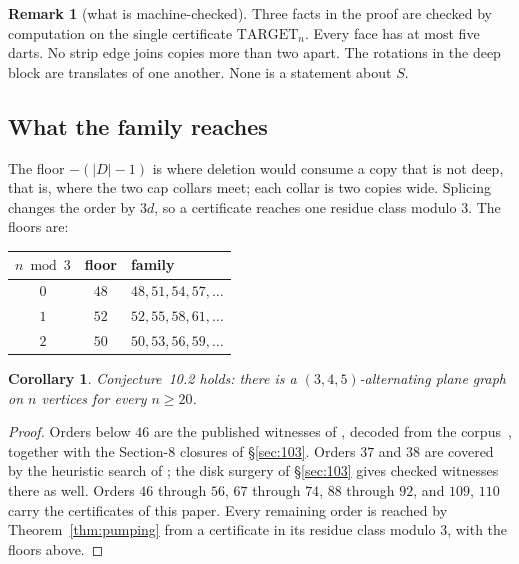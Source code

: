 \documentclass[11pt,a4paper]{amsart}
\theoremstyle{plain}
\newtheorem{corollary}[theorem]{Corollary}
\theoremstyle{definition}
\newtheorem{remark}[theorem]{Remark}
\begin{document}
\begin{remark}[what is machine-checked]\label{rem:hypotheses}
Three facts in the proof are checked by computation on the single certificate
$\mathrm{TARGET}_n$. Every face has at most five darts. No strip edge joins
copies more than two apart. The rotations in the deep block are translates of
one another. None is a statement about $S$.
\end{remark}

\subsection{What the family reaches}

The floor $-(|D|-1)$ is where deletion would consume a copy that is not deep,
that is, where the two cap collars meet; each collar is two copies wide.
Splicing changes the order by $3d$, so a certificate reaches one residue class
modulo $3$. The floors are:

\begin{center}
\begin{tabular}{ccl}
\toprule
$n \bmod 3$ & floor & family \\
\midrule
$0$ & $48$ & $48, 51, 54, 57, \dots$ \\
$1$ & $52$ & $52, 55, 58, 61, \dots$ \\
$2$ & $50$ & $50, 53, 56, 59, \dots$ \\
\bottomrule
\end{tabular}
\end{center}

\begin{corollary}\label{cor:102}
Conjecture~10.2 holds: there is a $(3,4,5)$-alternating plane graph on $n$
vertices for every $n \ge 20$.
\end{corollary}

\begin{proof}
Orders below $46$ are the published witnesses of \cite{AHSSV2015}, decoded from
the corpus~\cite{APGcorpus}, together with the Section-8 closures of
\S\ref{sec:103}. Orders $37$ and $38$ are covered by the heuristic search of
\cite{AHSSV2015}; the disk surgery of \S\ref{sec:103} gives checked witnesses
there as well. Orders $46$ through $56$, $67$ through $74$, $88$ through $92$,
and $109$, $110$ carry the certificates of this paper. Every remaining order is
reached by Theorem~\ref{thm:pumping} from a certificate in its residue class
modulo $3$, with the floors above.
\end{proof}
\end{document}
